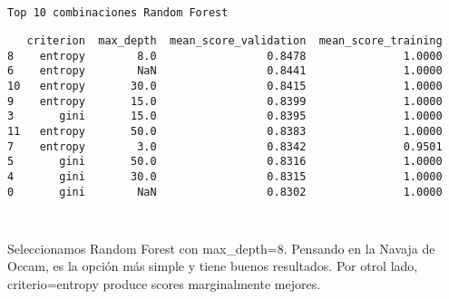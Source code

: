 \documentclass[11pt]{article}
\begin{document}
    \begin{Verbatim}[commandchars=\\\{\}]
 
 
Top 10 combinaciones Random Forest

    \end{Verbatim}

    
    \begin{verbatim}
   criterion  max_depth  mean_score_validation  mean_score_training
8    entropy        8.0                 0.8478               1.0000
6    entropy        NaN                 0.8441               1.0000
10   entropy       30.0                 0.8415               1.0000
9    entropy       15.0                 0.8399               1.0000
3       gini       15.0                 0.8395               1.0000
11   entropy       50.0                 0.8383               1.0000
7    entropy        3.0                 0.8342               0.9501
5       gini       50.0                 0.8316               1.0000
4       gini       30.0                 0.8315               1.0000
0       gini        NaN                 0.8302               1.0000
    \end{verbatim}

    
    \begin{Verbatim}[commandchars=\\\{\}]
 

    \end{Verbatim}

    Seleccionamos Random Forest con max\_depth=8. Pensando en la Navaja de
Occam, es la opción más simple y tiene buenos resultados. Por otrol
lado, criterio=entropy produce scores marginalmente mejores.
\end{document}
